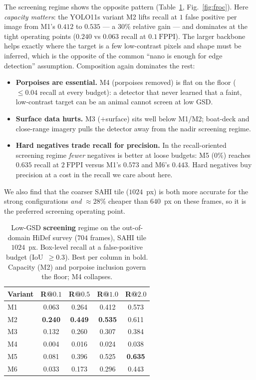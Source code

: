 \documentclass[11pt,a4paper]{article}
\newcommand{\fppi}{\text{FPPI}}
\begin{document}
The screening regime shows the opposite pattern (Table~\ref{tab:froc},
Fig.~\ref{fig:froc}). Here \emph{capacity matters}: the YOLO11s variant M2
lifts recall at $1$ false positive per image from M1's $0.412$ to
\textbf{$0.535$} --- a $30\%$ relative gain --- and dominates at the tight
operating points ($0.240$ vs $0.063$ recall at $0.1\ \fppi$). The larger
backbone helps exactly where the target is a few low-contrast pixels and shape
must be inferred, which is the opposite of the common ``nano is enough for edge
detection'' assumption. Composition again dominates the rest:
\begin{itemize}[itemsep=2pt,topsep=2pt]
  \item \textbf{Porpoises are essential.} M4 (porpoises removed) is flat on the
  floor ($\le\!0.04$ recall at every budget): a detector that never learned that
  a faint, low-contrast target can be an animal cannot screen at low GSD.
  \item \textbf{Surface data hurts.} M3 ($+$surface) sits well below M1/M2;
  boat-deck and close-range imagery pulls the detector away from the nadir
  screening regime.
  \item \textbf{Hard negatives trade recall for precision.} In the
  recall-oriented screening regime \emph{fewer} negatives is better at loose
  budgets: M5 ($0\%$) reaches $0.635$ recall at $2\ \fppi$ versus M1's $0.573$
  and M6's $0.443$. Hard negatives buy precision at a cost in the recall we
  care about here.
\end{itemize}
We also find that the coarser SAHI tile ($1024$~px) is both more accurate for
the strong configurations \emph{and} $\approx\!28\%$ cheaper than $640$~px on
these frames, so it is the preferred screening operating point.

\begin{table}[t]
\centering
\caption{Low-GSD \textbf{screening} regime on the out-of-domain HiDef
survey ($704$ frames), SAHI tile $1024$~px. Box-level recall at a false-positive
budget (IoU~$\ge\!0.3$). Best per column in bold. Capacity (M2) and porpoise
inclusion govern the floor; M4 collapses.}
\label{tab:froc}
\small
\setlength{\tabcolsep}{6pt}
\begin{tabular}{lcccc}
\toprule
Variant & R@$0.1$ & R@$0.5$ & R@$1.0$ & R@$2.0$ \\
\midrule
M1  & 0.063 & 0.264 & 0.412 & 0.573 \\
M2  & \textbf{0.240} & \textbf{0.449} & \textbf{0.535} & 0.611 \\
M3  & 0.132 & 0.260 & 0.307 & 0.384 \\
M4  & 0.004 & 0.016 & 0.024 & 0.038 \\
M5  & 0.081 & 0.396 & 0.525 & \textbf{0.635} \\
M6  & 0.033 & 0.173 & 0.296 & 0.443 \\
\bottomrule
\end{tabular}
\end{table}
\end{document}
